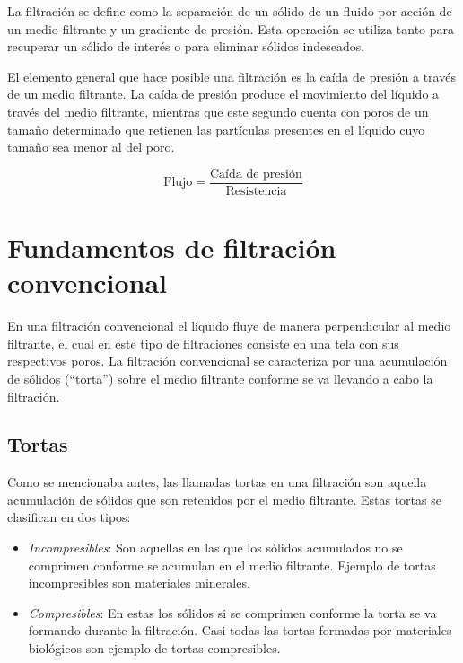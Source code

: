 
La filtración se define como la separación de un sólido de un fluido por acción de un medio filtrante y un gradiente de presión. Esta operación se utiliza tanto para recuperar un sólido de interés o para eliminar sólidos indeseados.

El elemento general que hace posible una filtración es la caída de presión a través de un medio filtrante. La caída de presión produce el movimiento del líquido a través del medio filtrante, mientras que este segundo cuenta con poros de un tamaño determinado que retienen las partículas presentes en el líquido cuyo tamaño sea menor al del poro.

\begin{equation}
    \text{Flujo} = \frac{\text{Caída de presión}}{\text{Resistencia}}
\end{equation}



\section{Fundamentos de filtración convencional}


En una filtración convencional el líquido fluye de manera perpendicular al medio filtrante, el cual en este tipo de filtraciones consiste en una tela con sus respectivos poros. La filtración convencional se caracteriza por una acumulación de sólidos (``torta'') sobre el medio filtrante conforme se va llevando a cabo la filtración. 



\subsection{Tortas}

Como se mencionaba antes, las llamadas tortas en una filtración son aquella acumulación de sólidos que son retenidos por el medio filtrante. Estas tortas se clasifican en dos tipos:

\begin{itemize}
    \item \emph{Incompresibles}: Son aquellas en las que los sólidos acumulados no se comprimen conforme se acumulan en el medio filtrante. Ejemplo de tortas incompresibles son materiales minerales.
    \item \emph{Compresibles}: En estas los sólidos si se comprimen conforme la torta se va formando durante la filtración. Casi todas las tortas formadas por materiales biológicos son ejemplo de tortas compresibles.
\end{itemize}

